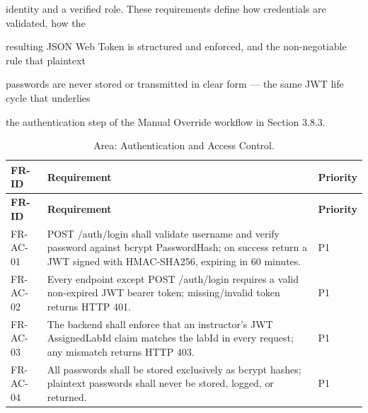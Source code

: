 identity and a verified role. These requirements define how credentials are validated, how the

resulting JSON Web Token is structured and enforced, and the non-negotiable rule that plaintext

passwords are never stored or transmitted in clear form --- the same JWT life cycle that underlies

the authentication step of the Manual Override workflow in Section 3.8.3.

\begin{longtable}{|L{2.0cm}|L{12.0cm}|L{1.5cm}|}
	\caption{Area: Authentication and Access Control.} \label{tab:3-15}                                                                                                                                     \\
	\hline
	\textbf{FR-ID} & \textbf{Requirement}                                                                                                                                               & \textbf{Priority} \\
	\hline
	\endfirsthead
	\hline
	\textbf{FR-ID} & \textbf{Requirement}                                                                                                                                               & \textbf{Priority} \\
	\hline
	\endhead
	\hline
	\endfoot
	\hline
	\endlastfoot
	FR-AC-01       & POST /auth/login shall validate username and verify password against bcrypt PasswordHash; on success return a JWT signed with HMAC-SHA256, expiring in 60 minutes. & P1                \\
	\hline
	FR-AC-02       & Every endpoint except POST /auth/login requires a valid non-expired JWT bearer token; missing/invalid token returns HTTP 401.                                      & P1                \\
	\hline
	FR-AC-03       & The backend shall enforce that an instructor's JWT AssignedLabId claim matches the labId in every request; any mismatch returns HTTP 403.                          & P1                \\
	\hline
	FR-AC-04       & All passwords shall be stored exclusively as bcrypt hashes; plaintext passwords shall never be stored, logged, or returned.                                        & P1                \\
	\hline
\end{longtable}


